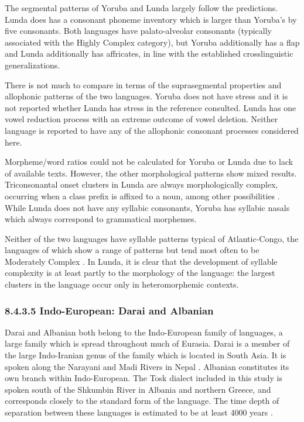   The segmental patterns of Yoruba and Lunda largely follow the predictions. Lunda does has a consonant phoneme inventory which is larger than Yoruba’s by five consonants. Both languages have palato-alveolar consonants (typically associated with the Highly Complex category), but Yoruba additionally has a flap and Lunda additionally has affricates, in line with the established crosslinguistic generalizations.



  There is not much to compare in terms of the suprasegmental properties and allophonic patterns of the two languages. Yoruba does not have stress and it is not reported whether Lunda has stress in the reference consulted. Lunda has one vowel reduction process with an extreme outcome of vowel deletion. Neither language is reported to have any of the allophonic consonant processes considered here.



  Morpheme/word ratios could not be calculated for Yoruba or Lunda due to lack of available texts. However, the other morphological patterns show mixed results. Triconsonantal onset clusters in Lunda are always morphologically complex, occurring when a class prefix is affixed to a noun, among other possibilities \citep[23-24]{Kawasha2003}. While Lunda does not have any syllabic consonants, Yoruba has syllabic nasals which always correspond to grammatical morphemes.



  Neither of the two languages have syllable patterns typical of Atlantic-Congo, the languages of which show a range of patterns but tend most often to be Moderately Complex \citep{Maddieson2013a}. In Lunda, it is clear that the development of syllable complexity is at least partly to the morphology of the language: the largest clusters in the language occur only in heteromorphemic contexts.


\subsubsection{\textbf{8.4.3.5} \textbf{Indo-European:} \textbf{Darai} \textbf{and} \textbf{Albanian}}

  Darai and Albanian both belong to the Indo-European family of languages, a large family which is spread throughout much of Eurasia. Darai is a member of the large Indo-Iranian genus of the family which is located in South Asia. It is spoken along the Narayani and Madi Rivers in Nepal \citep{Dhakal2012}. Albanian constitutes its own branch within Indo-European. The Tosk dialect included in this study is spoken south of the Shkumbin River in Albania and northern Greece, and corresponds closely to the standard form of the language. The time depth of separation between these languages is estimated to be at least 4000 years \citep[146]{Garrett2006}.



